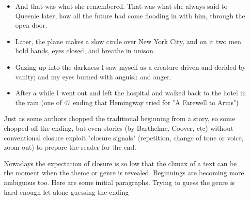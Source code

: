 \documentclass[11pt]{article}
\begin{document}
\begin{itemize}
    \item And that was what she remembered. That was what she always said to Queenie later, how all the future had come flooding in with him, through the open door.
    \item Later, the plane makes a slow circle over New York City, and on it two men hold hands, eyes closed, and breathe in unison.
    \item Gazing up into the darkness I saw myself as a creature driven and derided by vanity; and my eyes burned with anguish and anger.
    \item After a while I went out and left the hospital and walked back to the hotel in the rain (one of 47 ending that  Hemingway tried for "A Farewell to Arms")

\end{itemize}


Just as some authors chopped the traditional beginning from a story, so some chopped off the ending, but even stories (by Barthelme, Coover, etc) without conventional closure exploit "closure signals" (repetition, change of tone or voice, zoom-out) to prepare the reader for the end.




Nowadays the expectation of closure is so low that the climax of a text can be the moment when the theme or genre is revealed. Beginnings are becoming more ambiguous too. Here are some initial paragraphs. Trying to guess the genre is hard enough let alone guessing the ending
\end{document}
